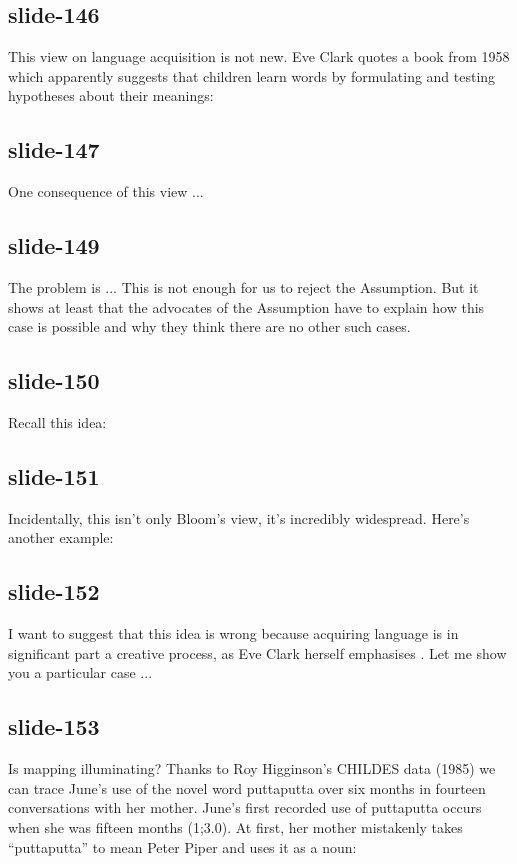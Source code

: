 \documentclass[12pt,\papersize]{extarticle}
\begin{document}
 
\subsection{slide-146}
This view on language acquisition is not new.
Eve Clark quotes a book from 1958 which apparently suggests that children learn words by formulating and testing hypotheses about their meanings:
 
 
\subsection{slide-147}
One consequence of this view ...
 
 
\subsection{slide-149}
The problem is ...
This is not enough for us to reject the Assumption. But it shows at least that the advocates of the Assumption have to explain how this case is possible and why they think there are no other such cases.
 
 
\subsection{slide-150}
Recall this idea:
 
 
\subsection{slide-151}
Incidentally, this isn't only Bloom's view, it's incredibly widespread.
Here's another example:
 
 
\subsection{slide-152}
I want to suggest that this idea is wrong because acquiring language is in significant part a creative process, as Eve Clark herself emphasises \citep[in][]{Clark:1993bv} .
Let me show you a particular case ...
 
 
\subsection{slide-153}
Is mapping illuminating?
Thanks to Roy Higginson's CHILDES data (1985) we can trace June's use of the novel word puttaputta over six months in fourteen conversations with her mother.
June's first recorded use of puttaputta occurs when she was fifteen months (1;3.0).
At first, her mother mistakenly takes “puttaputta” to mean Peter Piper and uses it as a noun:
 
\end{document}
